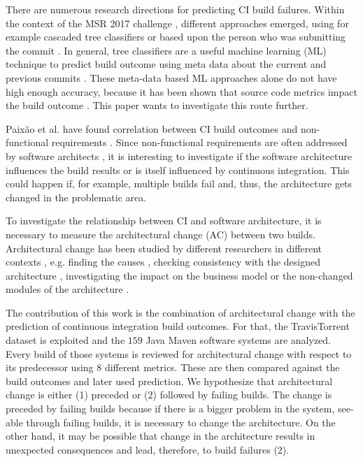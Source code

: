 \documentclass[sigplan, anonymous, review]{acmart}
\begin{document}
There are numerous research directions for predicting CI build failures. Within the context of the MSR 2017 challenge \cite{TravisTorrent}, different approaches emerged, using for example cascaded tree classifiers \cite{Pred-Cascade} or based upon the person who was submitting the commit \cite{ContrInvolv}. In general, tree classifiers are a useful machine learning (ML) technique to predict build outcome using meta data about the current and previous commits \cite{Pred-Tree}. 
These meta-data based ML approaches alone do not have high enough accuracy, because it has been shown that source code metrics impact the build outcome \cite{FailsCorr}. This paper wants to investigate this route further. 

Paix\~{a}o et al. have found correlation between CI build outcomes and non-functional requirements \cite{Fail-NFReq}. Since non-functional requirements are often addressed by software architects \cite{NFR-Architects}, it is interesting to investigate if the software architecture influences the build results or is itself influenced by continuous integration. 
This could happen if, for example, multiple builds fail and, thus, the architecture gets changed in the problematic area.

To investigate the relationship between CI and software architecture, it is necessary to measure the architectural change (AC) between two builds. Architectural change has been studied by different researchers in different contexts \cite{Aramis,StructDist,Arc-MDSE,Arcade-Base} , e.g.  finding the causes \cite{AC-Causes}, checking consistency with the designed architecture \cite{ArcConf, ArcCons}, investigating the impact on the business model \cite{ArcChange-Business} or the non-changed modules of the architecture \cite{Knowledge-AC}. 

The contribution of this work is the combination of architectural change with the prediction of continuous integration build outcomes. For that, the TravisTorrent dataset is exploited and the $159$ Java Maven software systems are analyzed. Every build of those systems is reviewed for architectural change with respect to its predecessor using 8 different metrics. These are then compared against the build outcomes and later used prediction. We hypothesize that architectural change is either (1) preceded or (2) followed by failing builds. 
The change is preceded by failing builds because if there is a bigger problem in the system, see-able through failing builds, it is necessary to change the architecture. 
On the other hand, it may be possible that change in the architecture results in unexpected consequences and lead, therefore, to build failures (2).
\end{document}

